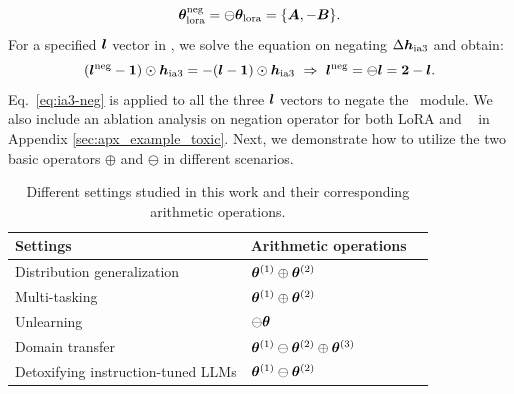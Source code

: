 \begin{equation}
{\bm{\theta}}_{\text{lora}}^{\text{neg}} = \ominus{\bm{\theta}}_{\text{lora}} = \{{\bm{A}}, -{\bm{B}}\}.
\end{equation}
For a specified ${\bm{l}}$ vector in \ia, we solve the equation on negating $\Delta {\bm{h}}_{\text{ia3}}$ and obtain:
\begin{equation}
\label{eq:ia3-neg}
    ({\bm{l}}^{\text{neg}} - \mathbf{1}) \odot {\bm{h}}_{\text{ia3}} = -({\bm{l}} - \mathbf{1}) \odot {\bm{h}}_{\text{ia3}} \ \Rightarrow \ {\bm{l}}^{\text{neg}} = \ominus {\bm{l}} = \mathbf{2}-{\bm{l}}.
\end{equation}
Eq.~\ref{eq:ia3-neg} is applied to all the three ${\bm{l}}$ vectors to negate the \ia~module. 
We also include an ablation analysis on negation operator for both LoRA and \ia~ in Appendix \ref{sec:apx_example_toxic}.
Next, we demonstrate how to utilize the two basic operators $\oplus$ and $\ominus$ in different scenarios.

\begin{table}[]
\centering
\caption{Different settings studied in this work and their corresponding arithmetic operations.}
\label{table:expls}
\begin{tabular}{lll}
\toprule
Settings & Arithmetic operations \\ \midrule
Distribution generalization & ${\bm{\theta}}^{(1)} \oplus {\bm{\theta}}^{(2)}$ \\
Multi-tasking & ${\bm{\theta}}^{(1)} \oplus {\bm{\theta}}^{(2)}$ \\
Unlearning & $\ominus {\bm{\theta}}$ \\
Domain transfer & ${\bm{\theta}}^{(1)} \ominus {\bm{\theta}}^{(2)} \oplus {\bm{\theta}}^{(3)}$ \\
Detoxifying instruction-tuned LLMs & ${\bm{\theta}}^{(1)} \ominus {\bm{\theta}}^{(2)}$ \\ 
\bottomrule
\end{tabular}
\end{table}


